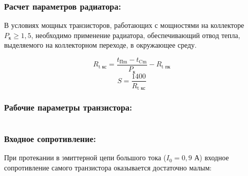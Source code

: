 \subsubsection{Расчет параметров радиатора:}

В условиях мощных транзисторов, работающих с мощностями на коллекторе $P_{\text{к}} \geq 1,5$, необходимо применение радиатора, обеспечивающий отвод тепла, выделяемого на коллекторном переходе, в окружающее среду.

\begin{equation}
\label{eq:equation2_12}
 R_{\text{t кс}} = \dfrac{t_{\text{Пm}} - t_{\text{Cm}}}{P_{\text{к}}} - R_{\text{t пк}}
\end{equation}
\begin{equation}
\label{eq:equation2_13}
 S = \dfrac{1400}{R_{\text{t кс}}}
\end{equation}
\begin{equation}
\label{eq:equation2_14}
 
\end{equation}
\begin{equation}
\label{eq:equation2_15}
 
\end{equation}

\subsubsection{Рабочие параметры транзистора:}

\begin{equation}
\label{eq:equation2_16}
 
\end{equation}
\begin{equation}
\label{eq:equation2_17}
 
\end{equation}
\begin{equation}
\label{eq:equation2_18}
 
\end{equation}

\subsubsection{Входное сопротивление:}

При протекании в эмиттерной цепи большого тока ($I_0 = 0,9$ А) входное сопротивление самого транзистора оказывается достаточно малым: 

\begin{equation}
\label{eq:equation2_19}
  
\end{equation}

